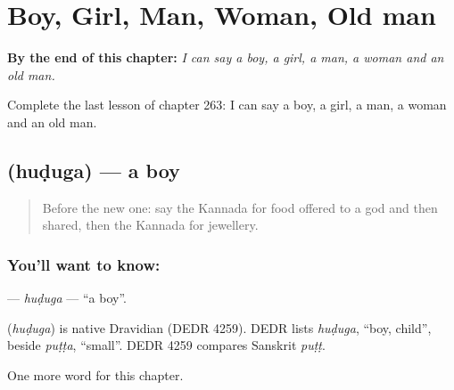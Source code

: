 
\chapter{Boy, Girl, Man, Woman, Old man}
\label{ch:ka-boy-girl-man-woman-old-man}

\begin{chapteropening}
\textbf{By the end of this chapter:} \emph{I can say a boy, a girl, a man, a woman and an old man.}

Complete the last lesson of chapter 263: I can say a boy, a girl, a man, a woman and an old man.
\end{chapteropening}

\section[\texorpdfstring{\kn{ಹುಡುಗ} (huḍuga)}{ಹುಡುಗ (huḍuga)}]{ (huḍuga) — a boy}

\label{lesson:KA-C263-huduga}



\begin{quote}
Before the new one: say the Kannada for food offered to a god and then shared, then the Kannada for jewellery.
\end{quote}

\subsection*{You'll want to know: }
\textbf{} — \emph{huḍuga} — \textquotedblleft{}a boy\textquotedblright{}.

\begin{cousinweb}
\textbf{} (\emph{huḍuga}) is native Dravidian (DEDR 4259). DEDR lists \emph{huḍuga}, \textquotedblleft{}boy, child\textquotedblright{}, beside \emph{puṭṭa}, \textquotedblleft{}small\textquotedblright{}. DEDR 4259 compares Sanskrit \emph{puṭṭ}.
\end{cousinweb}

\begin{grammarlens}[title={What you've built}]
One more word for this chapter.
\end{grammarlens}

